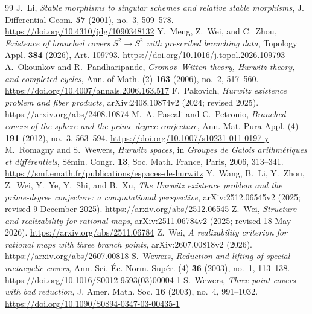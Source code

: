 \documentclass[10pt,a4paper]{amsart}
\numberwithin{equation}{section}
\begin{document}
\begin{thebibliography}{99}
 J.~Li, \emph{Stable morphisms to singular schemes and relative stable morphisms}, J. Differential Geom. \textbf{57} (2001), no.~3, 509--578. \url{https://doi.org/10.4310/jdg/1090348132}
 Y.~Meng, Z.~Wei, and C.~Zhou, \emph{Existence of branched covers $S^2\to S^2$ with prescribed branching data}, Topology Appl. \textbf{384} (2026), Art. 109793. \url{https://doi.org/10.1016/j.topol.2026.109793}
 A.~Okounkov and R.~Pandharipande, \emph{Gromov--Witten theory, Hurwitz theory, and completed cycles}, Ann. of Math. (2) \textbf{163} (2006), no.~2, 517--560. \url{https://doi.org/10.4007/annals.2006.163.517}
 F.~Pakovich, \emph{Hurwitz existence problem and fiber products}, arXiv:2408.10874v2 (2024; revised 2025). \url{https://arxiv.org/abs/2408.10874}
 M.~A. Pascali and C.~Petronio, \emph{Branched covers of the sphere and the prime-degree conjecture}, Ann. Mat. Pura Appl. (4) \textbf{191} (2012), no.~3, 563--594. \url{https://doi.org/10.1007/s10231-011-0197-y}
 M.~Romagny and S.~Wewers, \emph{Hurwitz spaces}, in \emph{Groupes de Galois arithm\'etiques et diff\'erentiels}, S\'emin. Congr. \textbf{13}, Soc. Math. France, Paris, 2006, 313--341. \url{https://smf.emath.fr/publications/espaces-de-hurwitz}
 Y.~Wang, B.~Li, Y.~Zhou, Z.~Wei, Y.~Ye, Y.~Shi, and B.~Xu, \emph{The Hurwitz existence problem and the prime-degree conjecture: a computational perspective}, arXiv:2512.06545v2 (2025; revised 9 December 2025). \url{https://arxiv.org/abs/2512.06545}
 Z.~Wei, \emph{Structure and realizability for rational maps}, arXiv:2511.06784v2 (2025; revised 18 May 2026). \url{https://arxiv.org/abs/2511.06784}
 Z.~Wei, \emph{A realizability criterion for rational maps with three branch points}, arXiv:2607.00818v2 (2026). \url{https://arxiv.org/abs/2607.00818}
 S.~Wewers, \emph{Reduction and lifting of special metacyclic covers}, Ann. Sci. \'{E}c. Norm. Sup\'er. (4) \textbf{36} (2003), no.~1, 113--138. \url{https://doi.org/10.1016/S0012-9593(03)00004-1}
 S.~Wewers, \emph{Three point covers with bad reduction}, J. Amer. Math. Soc. \textbf{16} (2003), no.~4, 991--1032. \url{https://doi.org/10.1090/S0894-0347-03-00435-1}
\end{thebibliography}
\end{document}
